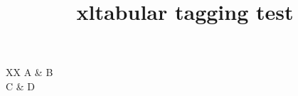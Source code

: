\documentclass{article}
\title{xltabular tagging test}
\begin{document}
\begin{xltabular}{\linewidth}{XX}
A & B \\
C & D \\
\end{xltabular}
\end{document}
